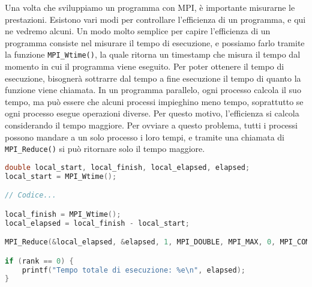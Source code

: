 Una volta che sviluppiamo un programma con MPI, è importante misurarne le prestazioni. Esistono vari modi per controllare l'efficienza di un programma, e qui ne vedremo alcuni.
\nwl
Un modo molto semplice per capire l'efficienza di un programma consiste nel misurare il tempo di esecuzione, e possiamo farlo tramite la funzione \verb|MPI_Wtime()|, la quale ritorna un timestamp che misura il tempo dal momento in cui il programma viene eseguito. Per poter ottenere il tempo di esecuzione, bisognerà sottrarre dal tempo a fine esecuzione il tempo di quanto la funzione viene chiamata.
\nwl
In un programma parallelo, ogni processo calcola il suo tempo, ma può essere che alcuni processi impieghino meno tempo, soprattutto se ogni processo esegue operazioni diverse. Per questo motivo, l'efficienza si calcola considerando il tempo maggiore. Per ovviare a questo problema, tutti i processi possono mandare a un solo processo i loro tempi, e tramite una chiamata di \verb|MPI_Reduce()| si può ritornare solo il tempo maggiore.

\begin{codeblock}
    \begin{lstlisting}[language = C]
double local_start, local_finish, local_elapsed, elapsed;
local_start = MPI_Wtime();

// Codice...

local_finish = MPI_Wtime();
local_elapsed = local_finish - local_start;

MPI_Reduce(&local_elapsed, &elapsed, 1, MPI_DOUBLE, MPI_MAX, 0, MPI_COMM_WORLD);

if (rank == 0) {
    printf("Tempo totale di esecuzione: %e\n", elapsed);
}\end{lstlisting}
\end{codeblock}

